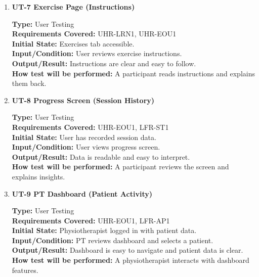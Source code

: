 \documentclass[12pt, titlepage]{article}
\begin{document}
\begin{enumerate}
\vspace{0.5em}

\item \textbf{UT-7 Exercise Page (Instructions)}

\textbf{Type:} User Testing \\
\textbf{Requirements Covered:} UHR-LRN1, UHR-EOU1\\
\textbf{Initial State:} Exercises tab accessible. \\
\textbf{Input/Condition:} User reviews exercise instructions. \\
\textbf{Output/Result:} Instructions are clear and easy to follow. \\
\textbf{How test will be performed:} A participant reads instructions and explains them back. \\

\vspace{0.5em}

\item \textbf{UT-8 Progress Screen (Session History)}

\textbf{Type:} User Testing \\
\textbf{Requirements Covered:} UHR-EOU1, LFR-ST1\\
\textbf{Initial State:} User has recorded session data. \\
\textbf{Input/Condition:} User views progress screen. \\
\textbf{Output/Result:} Data is readable and easy to interpret. \\
\textbf{How test will be performed:} A participant reviews the screen and explains insights. \\

\vspace{0.5em}

\item \textbf{UT-9 PT Dashboard (Patient Activity)}

\textbf{Type:} User Testing \\
\textbf{Requirements Covered:} UHR-EOU1, LFR-AP1\\
\textbf{Initial State:} Physiotherapist logged in with patient data. \\
\textbf{Input/Condition:} PT reviews dashboard and selects a patient. \\
\textbf{Output/Result:} Dashboard is easy to navigate and patient data is clear. \\
\textbf{How test will be performed:} A physiotherapist interacts with dashboard features. \\


\end{enumerate}
\end{document}
